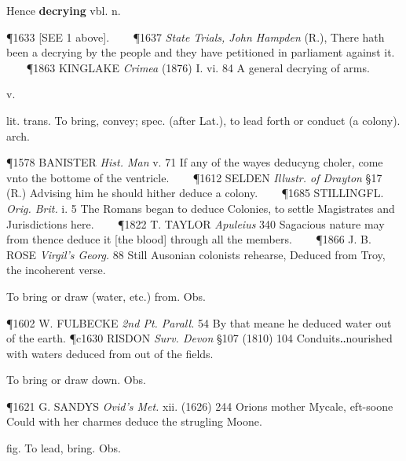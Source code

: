 \begin{description}[wide, labelwidth=!, labelindent=0pt]
\begin{myenumerate}
\noindent Hence \textbf{decrying} vbl. n.

\P 1633 [SEE  1 above].    
\P 1637 \textit{State  Trials, John Hampden} (R.), There hath been a decrying by the people and they have petitioned in parliament against it.    
\P 1863 KINGLAKE  \textit{Crimea} (1876) I. vi. 84 A general decrying of arms.
\end{myenumerate}


 v.

\noindent {}


\vspace{-0.3cm}

\begin{myenumerate}
 lit. trans.  To bring, convey; spec. (after Lat.), to lead forth or conduct (a colony). arch.

\P 1578 BANISTER  \textit{Hist. Man} v. 71 If any of the wayes deducyng choler, come vnto the bottome of the ventricle.    
\P 1612 SELDEN  \textit{Illustr. of Drayton} §17 (R.) Advising him he should hither deduce a colony.    
\P 1685 STILLINGFL.  \textit{Orig. Brit.} i. 5 The Romans began to deduce Colonies, to settle Magistrates and Jurisdictions here.    
\P 1822 T. TAYLOR  \textit{Apuleius} 340 Sagacious nature may from thence deduce it [the blood] through all the members.    
\P 1866 J. B. ROSE  \textit{Virgil's Georg.} 88 Still Ausonian colonists rehearse, Deduced from Troy, the incoherent verse.

 To bring or draw (water, etc.) from. Obs.

\P 1602 W. FULBECKE  \textit{2nd Pt. Parall.} 54 By that meane he deduced water out of the earth.
\P c1630 RISDON  \textit{Surv. Devon} §107 (1810) 104 Conduits‥nourished with waters deduced from out of the fields.

 To bring or draw down. Obs.

\P 1621 G. SANDYS  \textit{Ovid's Met.} xii. (1626) 244 Orions mother Mycale, eft-soone Could with her charmes deduce the strugling Moone.

 fig.  To lead, bring. Obs.


\end{myenumerate}
\end{description}
